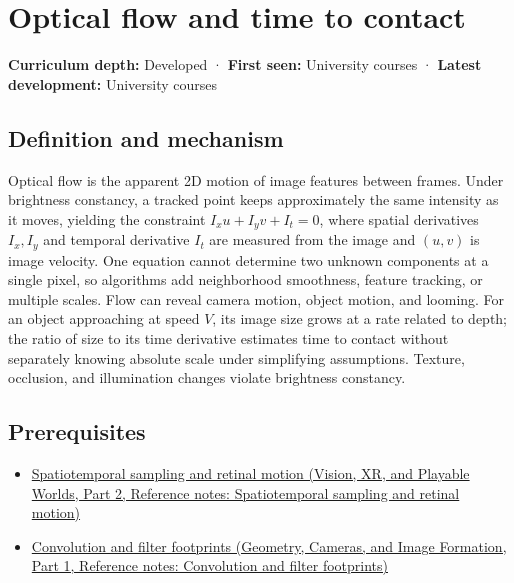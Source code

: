 \hypertarget{appendix-e2e73f8cd93e}{}\label{referencestart:appendix-e2e73f8cd93e}
\section{Optical flow and time to contact}\label{appendix-e2e73f8cd93e-optical-flow-and-time-to-contact}

\hypertarget{appendix-e2e73f8cd93e-optical-flow-and-time-to-contact}{}

\textbf{Curriculum depth:} Developed · \textbf{First seen:} University courses · \textbf{Latest development:} University courses

\begin{allmightroledefinition}

\subsection{Definition and mechanism}\label{appendix-e2e73f8cd93e-definition-and-mechanism}

\hypertarget{appendix-e2e73f8cd93e-definition-and-mechanism}{}

Optical flow is the apparent 2D motion of image features between frames. Under brightness constancy, a tracked point keeps approximately the same intensity as it moves, yielding the constraint \(I_xu+I_yv+I_t=0\), where spatial derivatives \(I_x,I_y\) and temporal derivative \(I_t\) are measured from the image and \((u,v)\) is image velocity. One equation cannot determine two unknown components at a single pixel, so algorithms add neighborhood smoothness, feature tracking, or multiple scales. Flow can reveal camera motion, object motion, and looming. For an object approaching at speed \(V\), its image size grows at a rate related to depth; the ratio of size to its time derivative estimates time to contact without separately knowing absolute scale under simplifying assumptions. Texture, occlusion, and illumination changes violate brightness constancy.

\end{allmightroledefinition}

\subsection{Prerequisites}\label{appendix-e2e73f8cd93e-prerequisites}

\hypertarget{appendix-e2e73f8cd93e-prerequisites}{}

\begin{itemize}
\tightlist
\item
  \href{../07-Vision-XR-and-Playable-Worlds-P02/main.pdf\#nameddest=appendix-70895739febb}{Spatiotemporal sampling and retinal motion (Vision, XR, and Playable Worlds, Part 2, Reference notes: Spatiotemporal sampling and retinal motion)}
\item
  \href{../03-Geometry-Cameras-and-Image-Formation-P01/main.pdf\#nameddest=appendix-d5b3c692d9f0}{Convolution and filter footprints (Geometry, Cameras, and Image Formation, Part 1, Reference notes: Convolution and filter footprints)}
\end{itemize}

